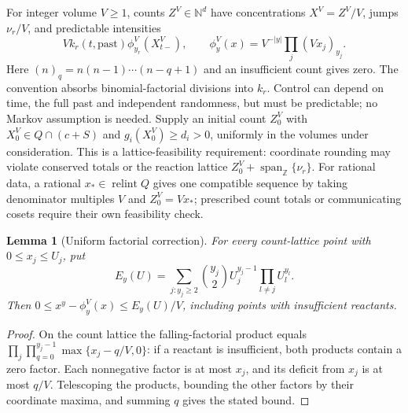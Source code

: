\documentclass[11pt]{article}
\newtheorem{lemma}[theorem]{Lemma}
\theoremstyle{definition}
\theoremstyle{remark}
\numberwithin{equation}{section}
\begin{document}
For integer volume $V\ge1$, counts $Z^V\in\mathbb N^d$ have
concentrations $X^V=Z^V/V$, jumps $\nu_r/V$, and predictable intensities
\begin{equation}
 V k_r(t,\text{past})\phi^V_{y_r}(X^V_{t-}),\qquad
 \phi^V_y(x)=V^{-|y|}\prod_j(Vx_j)_{y_j}.
 \label{eq:jump-intensity}
\end{equation}
Here $(n)_q=n(n-1)\cdots(n-q+1)$ and an insufficient count gives zero.
The convention absorbs binomial-factorial divisions into $k_r$.
Control can depend on time, the full past and independent randomness,
but must be predictable; no Markov assumption is needed. Supply an
initial count $Z^V_0$ with $X^V_0\in Q\cap(c+S)$ and
$g_i(X^V_0)\ge d_i>0$, uniformly in the volumes under consideration.
This is a lattice-feasibility requirement: coordinate rounding may
violate conserved totals or the reaction lattice
$Z^V_0+\operatorname{span}_{\mathbb Z}\{\nu_r\}$.
For rational data, a rational $x_*\in\operatorname{relint}Q$ gives one
compatible sequence by taking denominator multiples $V$ and
$Z^V_0=Vx_*$; prescribed count totals or communicating cosets require
their own feasibility check.

\begin{lemma}[Uniform factorial correction]
For every count-lattice point with $0\le x_j\le U_j$, put
\[
 E_y(U)=\sum_{j:y_j\ge2}\binom{y_j}{2}
              U_j^{y_j-1}\prod_{l\ne j}U_l^{y_l}.
\]
Then $0\le x^y-\phi^V_y(x)\le E_y(U)/V$, including points with
insufficient reactants.
\end{lemma}
\begin{proof}
On the count lattice the falling-factorial product equals
$\prod_{j}\prod_{q=0}^{y_j-1}\max\{x_j-q/V,0\}$: if a reactant is
insufficient, both products contain a zero factor. Each nonnegative
factor is at most $x_j$, and its deficit from $x_j$ is at most $q/V$.
Telescoping the products, bounding the other factors by their coordinate
maxima, and summing $q$ gives the stated bound.
\end{proof}
\end{document}
